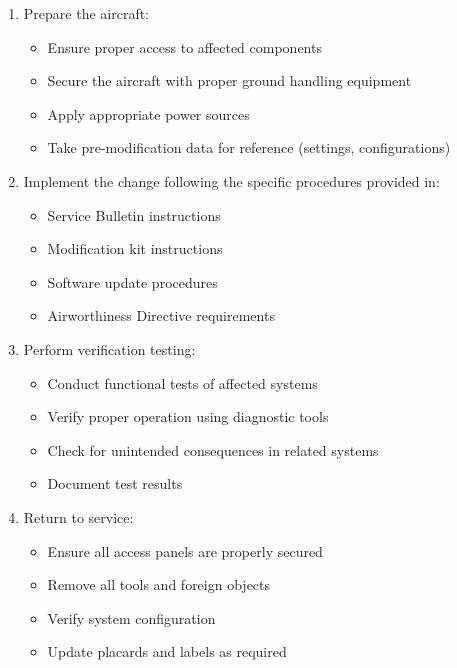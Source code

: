 \documentclass[12pt,a4paper,twoside,openright]{book}
\begin{document}
\begin{enumerate}
    \item Prepare the aircraft:
    \begin{itemize}
        \item Ensure proper access to affected components
        \item Secure the aircraft with proper ground handling equipment
        \item Apply appropriate power sources
        \item Take pre-modification data for reference (settings, configurations)
    \end{itemize}
    
    \item Implement the change following the specific procedures provided in:
    \begin{itemize}
        \item Service Bulletin instructions
        \item Modification kit instructions
        \item Software update procedures
        \item Airworthiness Directive requirements
    \end{itemize}
    
    \item Perform verification testing:
    \begin{itemize}
        \item Conduct functional tests of affected systems
        \item Verify proper operation using diagnostic tools
        \item Check for unintended consequences in related systems
        \item Document test results
    \end{itemize}
    
    \item Return to service:
    \begin{itemize}
        \item Ensure all access panels are properly secured
        \item Remove all tools and foreign objects
        \item Verify system configuration
        \item Update placards and labels as required
    \end{itemize}
\end{enumerate}
\end{document}
